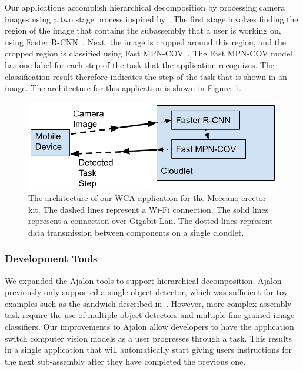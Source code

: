 Our applications accomplish hierarchical decomposition by processing camera
images using a two stage process inspired by \citet{gebru2017finegrained}.
The first stage involves finding the region of the
image that contains the subassembly that a user is working on, using Faster
R-CNN~\cite{frcnn}.
Next, the image is cropped around this region, and the cropped region is
classified using Fast MPN-COV~\cite{Li_2018_CVPR}.
The Fast MPN-COV model has one label for each step of the task
that the application recognizes.
The classification result therefore indicates the step of the task that is shown
in an image.
The architecture for this application is shown in Figure~\ref{fig:arch}.

\begin{figure}
  \includegraphics[width=\columnwidth]{figures/architecture.pdf}
  \caption{
    The architecture of our WCA application for the Meccano erector kit.
    The dashed lines represent a Wi-Fi connection.
    The solid lines represent a connection over Gigabit Lan.
    The dotted lines represent data transmission between components on a single
    cloudlet.
  }\label{fig:arch}
\end{figure}

\subsubsection{Development Tools}

We expanded the Ajalon tools to support hierarchical decomposition.
Ajalon previously only supported a single object detector, which was sufficient
for toy examples such as the sandwich described in~\cite{chen2017}.
However, more complex assembly task require the use of multiple object detectors
and multiple fine-grained image classifiers.
Our improvements to Ajalon allow developers to have the application switch
computer vision models as a user progresses through a task.
This results in a single application that will automatically start
giving users instructions for the next sub-assembly after they have completed
the previous one.

